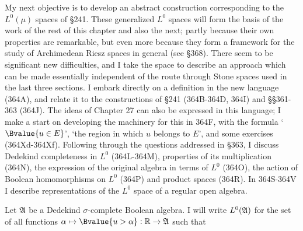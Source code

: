 
\def\chaptername{Function spaces}
\def\sectionname{$L^0$}

\def\dottimes{\mskip5mu\dot\times\mskip5mu}
\def\frdotplus{\mskip5mu\dot+\mskip5mu}
\def\smalldashint{\vrule height2.6pt width4.3pt depth-2.4pt
  \mskip-8.5mu\smallint}


My next objective is to develop an abstract construction corresponding
to the $L^0(\mu)$ spaces of \S241.   These generalized $L^0$ spaces
will form the basis of the work of the rest of this chapter and also the
next;  partly because their own properties are remarkable, but even
more because they form a framework for the study of Archimedean Riesz
spaces in general (see \S368).   There seem to be significant new
difficulties, and I take the space to describe an approach which
can be made essentially independent of the route through Stone spaces
used in the last three sections.   
I embark directly on a definition in
the new language (364A), and relate it to the constructions of \S241
(364B-364D, 364I) and \S\S361-363 (364J).   The ideas of Chapter 27 can
also be expressed in this language;  I make a start on developing the
machinery for this in 364F, with the formula `$\Bvalue{u\in E}$',
`the region in which $u$ belongs to $E$', and some exercises
(364Xd-364Xf).    Following through
the questions addressed in \S363, I discuss Dedekind completeness in
$L^0$ (364L-364M), properties of its multiplication (364N), the
expression of the original algebra in terms of $L^0$ (364O), the action
of Boolean homomorphisms on $L^0$ (364P) and product spaces (364R).   In
364S-364V I describe representations of the $L^0$ space of a regular
open algebra.

Let $\frak A$ be a Dedekind
$\sigma$-complete Boolean algebra.   I will write $L^0(\frak A)$ for the
set of all functions $\alpha\mapsto\Bvalue{u>\alpha}:\Bbb R\to\frak A$
such that



